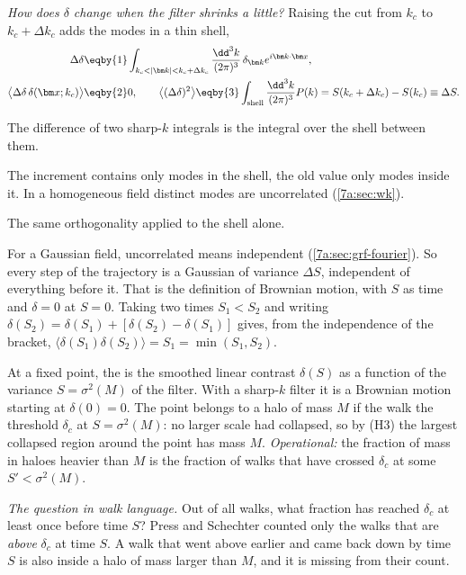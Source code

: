 \emph{How does $\delta$ change when the filter shrinks a little?} Raising the
cut from $k_c$ to $k_c+\Delta k_c$ adds the modes in a thin shell,
\begin{align}
  \Delta\delta
  &\eqby{1}\int_{k_c<|\bm k|<k_c+\Delta k_c}\frac{\dd^3k}{(2\pi)^3}\,
      \delta_{\bm k}e^{i\bm k\cdot\bm x},\nonumber\\
  \bigl\langle\Delta\delta\,\delta(\bm x;k_c)\bigr\rangle
  &\eqby{2}0,\qquad
  \bigl\langle(\Delta\delta)^2\bigr\rangle
   \eqby{3}\int_{\text{shell}}\frac{\dd^3k}{(2\pi)^3}P(k)
   =S(k_c+\Delta k_c)-S(k_c)\equiv\Delta S .
  \label{11b:eq:increments}
\end{align}
\begin{explain}
  \item The difference of two sharp-$k$ integrals is the integral over the shell
        between them.
  \item The increment contains only modes in the shell, the old value only modes
        inside it. In a homogeneous field distinct modes are uncorrelated
        (\cref{7a:sec:wk}).
  \item The same orthogonality applied to the shell alone.
\end{explain}
For a Gaussian field, uncorrelated means independent (\cref{7a:sec:grf-fourier}).
So every step of the trajectory is a Gaussian of variance $\Delta S$, independent
of everything before it. That is the definition of Brownian motion, with $S$ as
time and $\delta=0$ at $S=0$. Taking two times $S_1<S_2$ and writing
$\delta(S_2)=\delta(S_1)+[\delta(S_2)-\delta(S_1)]$ gives, from the independence
of the bracket, $\langle\delta(S_1)\delta(S_2)\rangle=S_1=\min(S_1,S_2)$.

\begin{workdef}
At a fixed point, the  is the smoothed linear contrast
$\delta(S)$ as a function of the variance $S=\sigma^2(M)$ of the filter. With a
sharp-$k$ filter it is a Brownian motion starting at $\delta(0)=0$. The point
belongs to a halo of mass $M$ if the walk  the threshold
$\delta_c$ at $S=\sigma^2(M)$: no larger scale had collapsed, so by (H3) the
largest collapsed region around the point has mass $M$.
\emph{Operational:} the fraction of mass in haloes heavier than $M$ is the
fraction of walks that have crossed $\delta_c$ at some $S'<\sigma^2(M)$.
\end{workdef}

\emph{The question in walk language.} Out of all walks, what fraction has
reached $\delta_c$ at least once before time $S$? Press and Schechter counted only
the walks that are \emph{above} $\delta_c$ at time $S$. A walk that went above
earlier and came back down by time $S$ is also inside a halo of mass larger than
$M$, and it is missing from their count.

